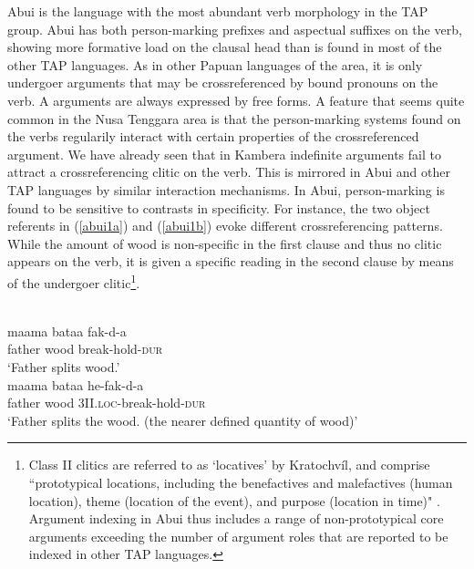 Abui is the language with the most abundant verb morphology in the TAP group. Abui has both person-marking prefixes and aspectual suffixes on the verb, showing more formative load on the clausal head than is found in most of the other TAP languages. As in other Papuan languages of the area, it is only undergoer arguments that may be crossreferenced by bound pronouns on the verb. A arguments are always expressed by free forms. A feature that seems quite common in the Nusa Tenggara area is that the person-marking systems found on the verbs regularily interact with certain properties of the crossreferenced argument. We have already seen that in Kambera indefinite arguments fail to attract a crossreferencing clitic on the verb. This is mirrored in Abui and other TAP languages by similar interaction mechanisms. In Abui, person-marking is found to be sensitive to contrasts in specificity. For instance, the two object referents in (\ref{abui1a}) and (\ref{abui1b}) evoke different crossreferencing patterns. While the amount of wood is non-specific in the first clause and thus no clitic appears on the verb, it is given a specific reading in the second clause by means of the undergoer clitic\footnote{Class II clitics are referred to as `locatives' by Kratochvíl, and comprise ``prototypical locations, including the
benefactives and malefactives (human location), theme (location of the event), and
purpose (location in time)" \citep[188]{kratochvil2007grammar}. Argument indexing in Abui thus includes a range of non-prototypical core arguments exceeding the number of argument roles that are reported to be indexed in other TAP languages.}.

\ea
{}\\
\ea \label{abui1a}
\gll maama bataa fak-d-a \\
father wood break-hold-\textsc{dur} \\
\glft `Father splits wood.’ \\ 
\ex \label{abui1b}
\gll maama bataa he-fak-d-a \\ 
father wood \textsc{3}II.\textsc{loc}-break-hold-\textsc{dur} \\
\glft `Father splits the wood. (the nearer defined quantity of wood)’\\ 
\z
\z

